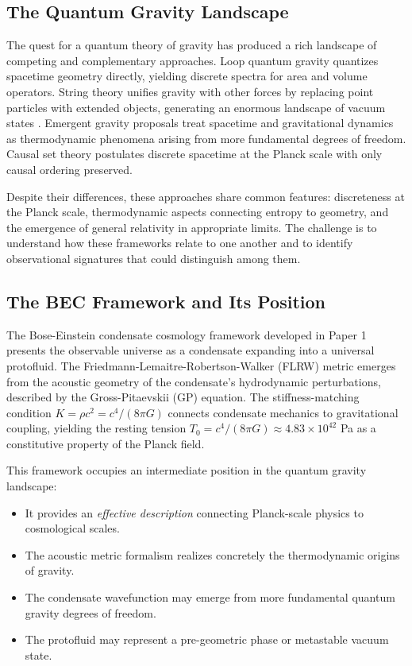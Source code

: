 \documentclass[11pt,a4paper]{article}
\newcommand{\Tzero}{\ensuremath{T_0}}
\newcommand{\Kbulk}{\ensuremath{K}}
\theoremstyle{definition}
\theoremstyle{remark}
\begin{document}
\subsection{The Quantum Gravity Landscape}
\label{sec:qg_landscape}

The quest for a quantum theory of gravity has produced a rich landscape of competing and complementary approaches. Loop quantum gravity \cite{Rovelli2004,Ashtekar2004} quantizes spacetime geometry directly, yielding discrete spectra for area and volume operators. String theory \cite{Polchinski1998} unifies gravity with other forces by replacing point particles with extended objects, generating an enormous landscape of vacuum states \cite{Susskind2003}. Emergent gravity proposals \cite{Jacobson1995,Verlinde2011,Padmanabhan2010} treat spacetime and gravitational dynamics as thermodynamic phenomena arising from more fundamental degrees of freedom. Causal set theory \cite{Sorkin2003} postulates discrete spacetime at the Planck scale with only causal ordering preserved.

Despite their differences, these approaches share common features: discreteness at the Planck scale, thermodynamic aspects connecting entropy to geometry, and the emergence of general relativity in appropriate limits. The challenge is to understand how these frameworks relate to one another and to identify observational signatures that could distinguish among them.

\subsection{The BEC Framework and Its Position}
\label{sec:bec_position}

The Bose-Einstein condensate cosmology framework developed in Paper 1 \cite{SkavbergBEC2025} presents the observable universe as a condensate expanding into a universal protofluid. The Friedmann-Lemaitre-Robertson-Walker (FLRW) metric emerges from the acoustic geometry of the condensate's hydrodynamic perturbations, described by the Gross-Pitaevskii (GP) equation. The stiffness-matching condition $\Kbulk = \rho c^2 = c^4/(8\pi G)$ connects condensate mechanics to gravitational coupling, yielding the resting tension $\Tzero = c^4/(8\pi G) \approx 4.83 \times 10^{42}$ Pa as a constitutive property of the Planck field.

This framework occupies an intermediate position in the quantum gravity landscape:
\begin{itemize}[leftmargin=*, itemsep=0.2em]
\item It provides an \emph{effective description} connecting Planck-scale physics to cosmological scales.
\item The acoustic metric formalism realizes concretely the thermodynamic origins of gravity.
\item The condensate wavefunction may emerge from more fundamental quantum gravity degrees of freedom.
\item The protofluid may represent a pre-geometric phase or metastable vacuum state.
\end{itemize}
\end{document}
